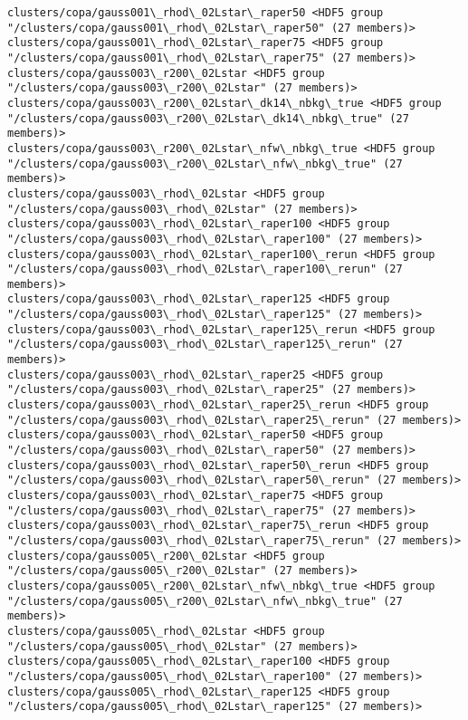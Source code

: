 \documentclass[11pt]{article}
\begin{document}
\begin{Verbatim}[commandchars=\\\{\}]
clusters/copa/gauss001\_rhod\_02Lstar\_raper50 <HDF5 group "/clusters/copa/gauss001\_rhod\_02Lstar\_raper50" (27 members)>
clusters/copa/gauss001\_rhod\_02Lstar\_raper75 <HDF5 group "/clusters/copa/gauss001\_rhod\_02Lstar\_raper75" (27 members)>
clusters/copa/gauss003\_r200\_02Lstar <HDF5 group "/clusters/copa/gauss003\_r200\_02Lstar" (27 members)>
clusters/copa/gauss003\_r200\_02Lstar\_dk14\_nbkg\_true <HDF5 group "/clusters/copa/gauss003\_r200\_02Lstar\_dk14\_nbkg\_true" (27 members)>
clusters/copa/gauss003\_r200\_02Lstar\_nfw\_nbkg\_true <HDF5 group "/clusters/copa/gauss003\_r200\_02Lstar\_nfw\_nbkg\_true" (27 members)>
clusters/copa/gauss003\_rhod\_02Lstar <HDF5 group "/clusters/copa/gauss003\_rhod\_02Lstar" (27 members)>
clusters/copa/gauss003\_rhod\_02Lstar\_raper100 <HDF5 group "/clusters/copa/gauss003\_rhod\_02Lstar\_raper100" (27 members)>
clusters/copa/gauss003\_rhod\_02Lstar\_raper100\_rerun <HDF5 group "/clusters/copa/gauss003\_rhod\_02Lstar\_raper100\_rerun" (27 members)>
clusters/copa/gauss003\_rhod\_02Lstar\_raper125 <HDF5 group "/clusters/copa/gauss003\_rhod\_02Lstar\_raper125" (27 members)>
clusters/copa/gauss003\_rhod\_02Lstar\_raper125\_rerun <HDF5 group "/clusters/copa/gauss003\_rhod\_02Lstar\_raper125\_rerun" (27 members)>
clusters/copa/gauss003\_rhod\_02Lstar\_raper25 <HDF5 group "/clusters/copa/gauss003\_rhod\_02Lstar\_raper25" (27 members)>
clusters/copa/gauss003\_rhod\_02Lstar\_raper25\_rerun <HDF5 group "/clusters/copa/gauss003\_rhod\_02Lstar\_raper25\_rerun" (27 members)>
clusters/copa/gauss003\_rhod\_02Lstar\_raper50 <HDF5 group "/clusters/copa/gauss003\_rhod\_02Lstar\_raper50" (27 members)>
clusters/copa/gauss003\_rhod\_02Lstar\_raper50\_rerun <HDF5 group "/clusters/copa/gauss003\_rhod\_02Lstar\_raper50\_rerun" (27 members)>
clusters/copa/gauss003\_rhod\_02Lstar\_raper75 <HDF5 group "/clusters/copa/gauss003\_rhod\_02Lstar\_raper75" (27 members)>
clusters/copa/gauss003\_rhod\_02Lstar\_raper75\_rerun <HDF5 group "/clusters/copa/gauss003\_rhod\_02Lstar\_raper75\_rerun" (27 members)>
clusters/copa/gauss005\_r200\_02Lstar <HDF5 group "/clusters/copa/gauss005\_r200\_02Lstar" (27 members)>
clusters/copa/gauss005\_r200\_02Lstar\_nfw\_nbkg\_true <HDF5 group "/clusters/copa/gauss005\_r200\_02Lstar\_nfw\_nbkg\_true" (27 members)>
clusters/copa/gauss005\_rhod\_02Lstar <HDF5 group "/clusters/copa/gauss005\_rhod\_02Lstar" (27 members)>
clusters/copa/gauss005\_rhod\_02Lstar\_raper100 <HDF5 group "/clusters/copa/gauss005\_rhod\_02Lstar\_raper100" (27 members)>
clusters/copa/gauss005\_rhod\_02Lstar\_raper125 <HDF5 group "/clusters/copa/gauss005\_rhod\_02Lstar\_raper125" (27 members)>

\end{Verbatim}
\end{document}
